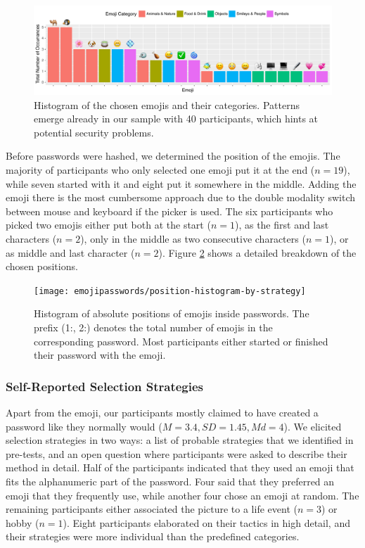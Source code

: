 \begin{figure}
	\centering
	\includegraphics[width=\linewidth]{figures/emojipasswords/emoji-distribution-histogram}
	\caption{\label{fig:emojipasswords:distribution-histogram} Histogram of the chosen emojis and their categories. Patterns emerge already in our sample with 40 participants, which hints at potential security problems.}
\end{figure}


Before passwords were hashed, we determined the position of the emojis. The majority of participants who only selected one emoji put it at the end ($n=19$), while seven started with it and eight put it somewhere in the middle. Adding the emoji there is the most cumbersome approach due to the double modality switch between mouse and keyboard if the picker is used. The six participants who picked two emojis either put both at the start ($n=1$), as the first and last characters ($n=2$), only in the middle as two consecutive characters ($n=1$), or as middle and last character ($n=2$). Figure \ref{fig:emojipasswords:position-histogram-by-strategy} shows a detailed breakdown of the chosen positions. 
\begin{figure}
	\centering
	\texttt{[image: emojipasswords/position-histogram-by-strategy]}
	\caption{\label{fig:emojipasswords:position-histogram-by-strategy} Histogram of absolute positions of emojis inside passwords. The prefix (1:, 2:) denotes the total number of emojis in the corresponding password. Most participants either started or finished their password with the emoji.}
\end{figure}


\subsubsection{Self-Reported Selection Strategies}
Apart from the emoji, our participants mostly claimed to have created a password like they normally would ($M=3.4, SD=1.45, Md=4$). 
We elicited selection strategies in two ways: a list of probable strategies that we identified in pre-tests, and an open question where participants were asked to describe their method in detail. Half of the participants indicated that they used an emoji that fits the alphanumeric part of the password. Four said that they preferred an emoji that they frequently use, while another four chose an emoji at random. The remaining participants either associated the picture to a life event ($n=3$) or hobby ($n=1$). Eight participants elaborated on their tactics in high detail, and their strategies were more individual than the predefined categories. 

